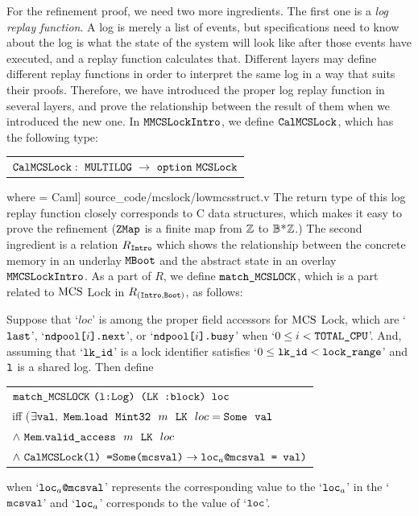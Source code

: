 For the refinement proof, we need two more ingredients.
The first one is a \emph{log replay function}.
A log is merely a list of events, but specifications need to know about the log is what the state of the system will look like after those events have executed,
and a replay function calculates that. 
Different layers may define different replay functions in order to interpret the same log in a way that suits their proofs.
Therefore, we have introduced the proper log replay function in several layers, and prove the relationship between the result of them when we introduced the new one.
In ${\mathrm{\texttt{MMCSLockIntro}}}$, we define ${\mathrm{\texttt{CalMCSLock}}}$, which has the following type:\newline
\begin{tabular}{P{0.95\textwidth}}
$ \calmcslock :\ \lockmultilog\ \rightarrow\ \optiondef\ \lockabsloc$
\end{tabular}\newline
where
 = Caml] {source_code/mcslock/lowmcsstruct.v}
The return type of this log replay function closely corresponds to C data structures, which makes it easy to prove the refinement (${\mathrm{\texttt{ZMap}}}$ is a finite map from ${\mathbb{Z}}$ to ${\mathbb{B}}$*${\mathbb{Z}}$.)
The second ingredient is a relation $R_{{\mathrm{\texttt{Intro}}}}$ which shows the relationship between the concrete memory in an underlay ${\mathrm{\texttt{MBoot}}}$ and the abstract state in an overlay ${\mathrm{\texttt{MMCSLockIntro}}}$.
As a part of $R$, we define $\matchmcslock$, which is a part related to 
 $\mathrm{MCS}$ Lock in $R_{({\mathrm{\texttt{Intro}}}, {\mathrm{\texttt{Boot}}})}$,  as follows:

\begin{definition}[$\matchmcslock$]
Suppose that `$loc$' is among the proper field accessors for  $\mathrm{MCS}$ Lock, which are `${\mathrm{\texttt{last}}}$', `${\mathrm{\texttt{ndpool[}}}i{\mathrm{\texttt{].next}}}$', or  `${\mathrm{\texttt{ndpool[}}}i{\mathrm{\texttt{].busy}}}$' when `$0 \leq i < {\mathrm{\texttt{TOTAL\_CPU}}}$'.
 And, assuming that `${\mathrm{\texttt{lk\_id}}}$' is a lock identifier satisfies `$0 \leq {\mathrm{\texttt{lk\_id}}} < {\mathrm{\texttt{lock\_range}}}$' and ${\mathrm{\texttt{l}}}$ is a shared log. Then define \newline
  \begin{tabular}{P{0.90\textwidth}}
    $\matchmcslock\ \codeinmath{(l:Log) (}\lockmemloc\codeinmath{ :block) loc}$\\
      iff ($\exists \codeinmath{val},\ \memloadsome{\memintregulartype}{m}{\lockmemloc}{loc}{\codeinmath{val}}$\\
        $\wedge\  {\mathrm{\texttt{Mem}}} . {\mathrm{\texttt{valid\_access}}} ~~{m} ~~ {{\mathrm{\texttt{LK}}}} ~~ {loc}$\\
      $\wedge\ \calmcslock \codeinmath{(l) =}\Some\codeinmath{(mcsval)}\rightarrow\codeinmath{loc}_{a}\codeinmath{@mcsval = val)}$\\
\end{tabular}\newline
    when `${\mathrm{\texttt{loc}}}_{a}{\mathrm{\texttt{@mcsval}}}$' represents the corresponding 
    value to the `${\mathrm{\texttt{loc}}}_{a}$' in the `${\mathrm{\texttt{mcsval}}}$' 
    and `${\mathrm{\texttt{loc}}}_{a}$' corresponds to the value of `${\mathrm{\texttt{loc}}}$'.
\end{definition}


